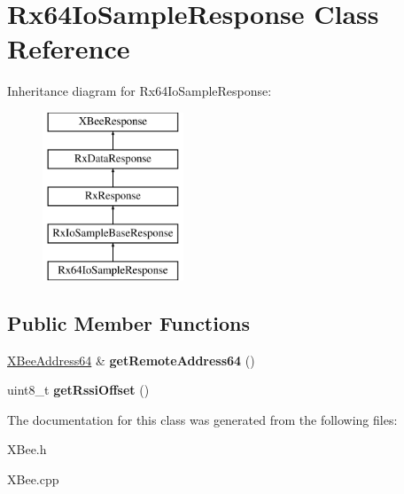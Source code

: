 \hypertarget{classRx64IoSampleResponse}{\section{\-Rx64\-Io\-Sample\-Response \-Class \-Reference}
\label{classRx64IoSampleResponse}
}
\-Inheritance diagram for \-Rx64\-Io\-Sample\-Response\-:\begin{figure}[H]
\begin{center}
\leavevmode
\includegraphics[height=5.000000cm]{classRx64IoSampleResponse}
\end{center}
\end{figure}
\subsection*{\-Public \-Member \-Functions}
\begin{DoxyCompactItemize}
\item 
\hypertarget{classRx64IoSampleResponse_a820798904df6b3bef202444e349f94dd}{\hyperlink{classXBeeAddress64}{\-X\-Bee\-Address64} \& {\bfseries get\-Remote\-Address64} ()}\label{classRx64IoSampleResponse_a820798904df6b3bef202444e349f94dd}

\item 
\hypertarget{classRx64IoSampleResponse_abd780d5ca68b8389c44371522f775eae}{uint8\-\_\-t {\bfseries get\-Rssi\-Offset} ()}\label{classRx64IoSampleResponse_abd780d5ca68b8389c44371522f775eae}

\end{DoxyCompactItemize}


\-The documentation for this class was generated from the following files\-:\begin{DoxyCompactItemize}
\item 
\-X\-Bee.\-h\item 
\-X\-Bee.\-cpp\end{DoxyCompactItemize}
